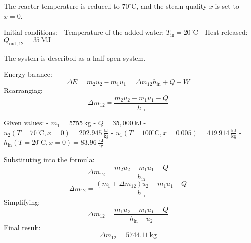 The reactor temperature is reduced to \( 70^\circ\text{C} \), and the steam quality \( x \) is set to \( x = 0 \).  

Initial conditions:  
- Temperature of the added water: \( T_{\text{in}} = 20^\circ\text{C} \)  
- Heat released: \( Q_{\text{out},12} = 35 \, \text{MJ} \)  

The system is described as a half-open system.  

Energy balance:  
\[
\Delta E = m_2 u_2 - m_1 u_1 = \Delta m_{12} h_{\text{in}} + Q - W
\]  
Rearranging:  
\[
\Delta m_{12} = \frac{m_2 u_2 - m_1 u_1 - Q}{h_{\text{in}}}
\]  

Given values:  
- \( m_1 = 5755 \, \text{kg} \)  
- \( Q = 35,000 \, \text{kJ} \)  
- \( u_2(T=70^\circ\text{C}, x=0) = 202.945 \, \frac{\text{kJ}}{\text{kg}} \)  
- \( u_1(T=100^\circ\text{C}, x=0.005) = 419.914 \, \frac{\text{kJ}}{\text{kg}} \)  
- \( h_{\text{in}}(T=20^\circ\text{C}, x=0) = 83.96 \, \frac{\text{kJ}}{\text{kg}} \)  

Substituting into the formula:  
\[
\Delta m_{12} = \frac{m_2 u_2 - m_1 u_1 - Q}{h_{\text{in}}}
\]  
\[
\Delta m_{12} = \frac{(m_1 + \Delta m_{12}) u_2 - m_1 u_1 - Q}{h_{\text{in}}}
\]  
Simplifying:  
\[
\Delta m_{12} = \frac{m_1 u_2 - m_1 u_1 - Q}{h_{\text{in}} - u_2}
\]  
Final result:  
\[
\Delta m_{12} = 5744.11 \, \text{kg}
\]